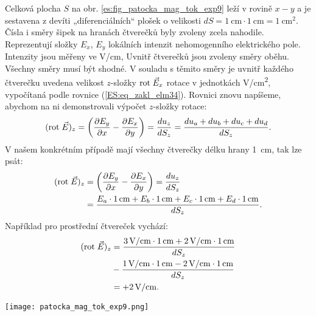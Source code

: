 \begin{example}\label{TEO:exam014}
  Celková plocha \(S\) na obr. \ref{es:fig_patocka_mag_tok_exp9} leží v rovině \(x-y\) a je 
  sestavena z devíti „diferenciálních“ plošek o velikosti \(dS = \SI{1}{\cm} \cdot \SI{1}{\cm} = 
  \SI{1}{\cm^2}\). Čísla i směry šipek na hranách čtverečků byly zvoleny zcela nahodile. 
  Reprezentují složky \(E_x\), \(E_y\) lokálních intenzit nehomogenního elektrického pole. 
  Intenzity jsou měřeny ve \si{V/\cm}, Uvnitř čtverečků jsou zvoleny směry oběhu. Všechny směry 
  musí být shodné. V souladu s těmito směry je uvnitř každého čtverečku uvedena velikost 
  \(z\)-složky \(\mathrm{rot}\;\vec{E}_x\) rotace v jednotkách \si{V/\cm^2}, vypočítaná podle rovnice 
  (\ref{ES:eq_zakl_elm34}). Rovnici znovu napíšeme, abychom na ni demonstrovali výpočet 
  \(z\)-složky rotace:
  \begin{equation*}
    (\mathrm{rot}\;\vec{E})_z   = \left(\dfrac{\partial E_y}{\partial x} - \dfrac{\partial E_x}{\partial y}\right)                  
                  = \frac{du_z}{dS_z}
                  = \frac{du_a + du_b + du_c + du_d}{dS_z}.
  \end{equation*}
  V našem konkrétním případě mají všechny čtverečky délku hrany \SI{1}{\cm}, tak lze psát:
  \begin{align*}
    (\rot{E})_z &= \left(\pder{E_y}{x} - \pder{E_x}{y}\right)
                 = \frac{du_z}{dS_z}                                          \\
                &= \frac{E_a\cdot\SI{1}{\cm} + E_b\cdot\SI{1}{\cm} + 
                    E_c\cdot\SI{1}{\cm} + E_d\cdot\SI{1}{\cm}}{dS_z}.
  \end{align*}
  Například pro prostřední čtvereček vychází:
  \begin{align*}
    (\rot{E})_z 
      &= \frac{\SI{3}{V/\cm}\cdot\SI{1}{\cm} + \SI{2}{V/\cm}\cdot\SI{1}{\cm}}{dS_z}  \\
      &- \frac{\SI{1}{V/\cm}\cdot\SI{1}{\cm} - \SI{2}{V/\cm}\cdot\SI{1}{\cm}}{dS_z}   \\
      &= + \SI{2}{V/\cm}.
  \end{align*}
  
   {\centering
    \captionsetup{type=figure}
    \texttt{[image: patocka\_mag\_tok\_exp9.png]}
    \label{es:fig_patocka_mag_tok_exp9}
  \par}
  

\end{example}
